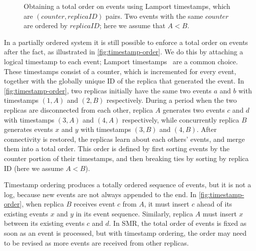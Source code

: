 \documentclass[sigconf,nonacm]{acmart}
\begin{document}
\begin{figure*}
  \caption{Obtaining a total order on events using Lamport timestamps, which are $(\mathit{counter}, \mathit{replicaID})$ pairs. Two events with the same $\mathit{counter}$ are ordered by $\mathit{replicaID}$; here we assume that $A<B$.}
  \label{fig:timestamp-order}
\end{figure*}

In a partially ordered system it is still possible to enforce a total order on events after the fact, as illustrated in \autoref{fig:timestamp-order}.
We do this by attaching a logical timestamp to each event; Lamport timestamps~\cite{Lamport:1978} are a common choice.
These timestamps consist of a counter, which is incremented for every event, together with the globally unique ID of the replica that generated the event.
In \autoref{fig:timestamp-order}, two replicas initially have the same two events $a$ and $b$ with timestamps $(1,A)$ and $(2,B)$ respectively.
During a period when the two replicas are disconnected from each other, replica $A$ generates two events $c$ and $d$ with timestamps $(3,A)$ and $(4,A)$ respectively, while concurrently replica $B$ generates events $x$ and $y$ with timestamps $(3,B)$ and $(4,B)$.
After connectivity is restored, the replicas learn about each others' events, and merge them into a total order.
This order is defined by first sorting events by the counter portion of their timestamps, and then breaking ties by sorting by replica ID (here we assume $A<B$).

Timestamp ordering produces a totally ordered sequence of events, but it is not a log, because new events are not always appended to the end.
In \autoref{fig:timestamp-order}, when replica $B$ receives event $c$ from $A$, it must insert $c$ ahead of its existing events $x$ and $y$ in its event sequence.
Similarly, replica $A$ must insert $x$ between its existing events $c$ and $d$.
In SMR, the total order of events is fixed as soon as an event is processed, but with timestamp ordering, the order may need to be revised as more events are received from other replicas.
\end{document}
